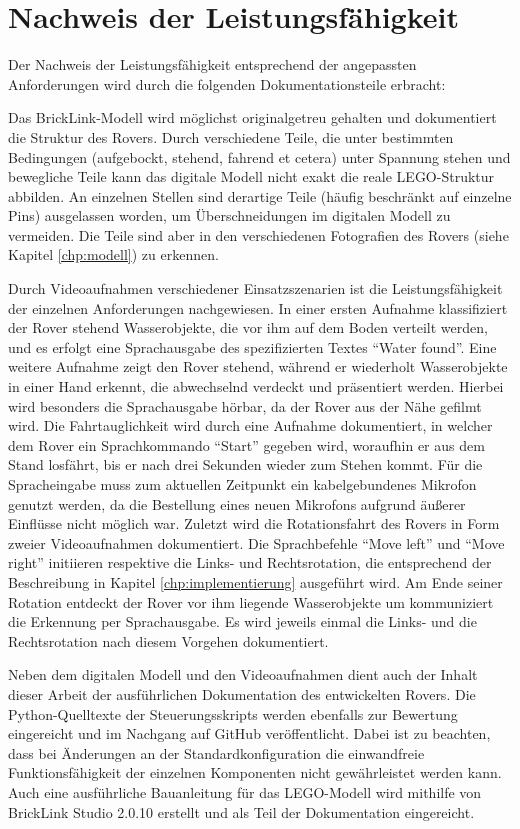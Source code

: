 \chapter{Nachweis der Leistungsfähigkeit}
\label{chp:nachweis_leistungsfaehigkeit}

Der Nachweis der Leistungsfähigkeit entsprechend der angepassten Anforderungen wird durch die folgenden Dokumentationsteile erbracht:

Das BrickLink-Modell wird möglichst originalgetreu gehalten und dokumentiert die Struktur des Rovers.
Durch verschiedene Teile, die unter bestimmten Bedingungen (aufgebockt, stehend, fahrend et cetera) unter Spannung stehen und bewegliche Teile kann das digitale Modell nicht exakt die reale LEGO-Struktur abbilden.
An einzelnen Stellen sind derartige Teile (häufig beschränkt auf einzelne Pins) ausgelassen worden, um Überschneidungen im digitalen Modell zu vermeiden.
Die Teile sind aber in den verschiedenen Fotografien des Rovers (siehe Kapitel \ref{chp:modell}) zu erkennen.

Durch Videoaufnahmen verschiedener Einsatzszenarien ist die Leistungsfähigkeit der einzelnen Anforderungen nachgewiesen.
In einer ersten Aufnahme klassifiziert der Rover stehend Wasserobjekte, die vor ihm auf dem Boden verteilt werden, und es erfolgt eine Sprachausgabe des spezifizierten Textes \enquote{Water found}.
Eine weitere Aufnahme zeigt den Rover stehend, während er wiederholt Wasserobjekte in einer Hand erkennt, die abwechselnd verdeckt und präsentiert werden.
Hierbei wird besonders die Sprachausgabe hörbar, da der Rover aus der Nähe gefilmt wird.
Die Fahrtauglichkeit wird durch eine Aufnahme dokumentiert, in welcher dem Rover ein Sprachkommando \enquote{Start} gegeben wird, woraufhin er aus dem Stand losfährt, bis er nach drei Sekunden wieder zum Stehen kommt.
Für die Spracheingabe muss zum aktuellen Zeitpunkt ein kabelgebundenes Mikrofon genutzt werden, da die Bestellung eines neuen Mikrofons aufgrund äußerer Einflüsse nicht möglich war.
Zuletzt wird die Rotationsfahrt des Rovers in Form zweier Videoaufnahmen dokumentiert.
Die Sprachbefehle \enquote{Move left} und \enquote{Move right} initiieren respektive die Links- und Rechtsrotation, die entsprechend der Beschreibung in Kapitel \ref{chp:implementierung} ausgeführt wird.
Am Ende seiner Rotation entdeckt der Rover vor ihm liegende Wasserobjekte um kommuniziert die Erkennung per Sprachausgabe.
Es wird jeweils einmal die Links- und die Rechtsrotation nach diesem Vorgehen dokumentiert.

Neben dem digitalen Modell und den Videoaufnahmen dient auch der Inhalt dieser Arbeit der ausführlichen Dokumentation des entwickelten Rovers.
Die Python-Quelltexte der Steuerungsskripts werden ebenfalls zur Bewertung eingereicht und im Nachgang auf GitHub veröffentlicht.
Dabei ist zu beachten, dass bei Änderungen an der Standardkonfiguration die einwandfreie Funktionsfähigkeit der einzelnen Komponenten nicht gewährleistet werden kann.
Auch eine ausführliche Bauanleitung für das LEGO-Modell wird mithilfe von BrickLink Studio 2.0.10 erstellt und als Teil der Dokumentation eingereicht.